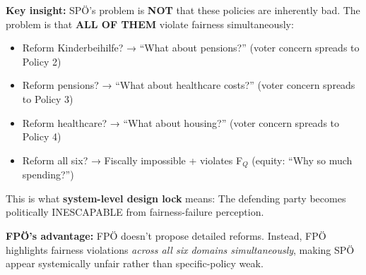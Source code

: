 \textbf{Key insight:} SPÖ's problem is \textbf{NOT} that these policies are inherently bad. The problem is that
\textbf{ALL OF THEM} violate fairness simultaneously:

\begin{itemize}[nosep]
\item Reform Kinderbeihilfe? → ``What about pensions?'' (voter concern spreads to Policy 2)
\item Reform pensions? → ``What about healthcare costs?'' (voter concern spreads to Policy 3)
\item Reform healthcare? → ``What about housing?'' (voter concern spreads to Policy 4)
\item Reform all six? → Fiscally impossible + violates F$_Q$ (equity: ``Why so much spending?'')
\end{itemize}

This is what \textbf{system-level design lock} means: The defending party becomes politically INESCAPABLE
from fairness-failure perception.

\textbf{FPÖ's advantage:} FPÖ doesn't propose detailed reforms. Instead, FPÖ highlights fairness violations
\textit{across all six domains simultaneously}, making SPÖ appear systemically unfair rather than specific-policy weak.

